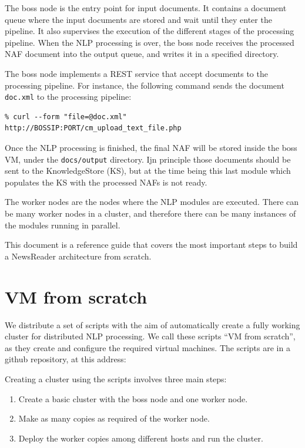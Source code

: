 \documentclass[a4]{article}
\begin{document}
The boss node is the entry point for input documents. It contains a document
queue where the input documents are stored and wait until they enter the
pipeline. It also supervises the execution of the different stages of the
processing pipeline. When the NLP processing is over, the boss node receives
the processed NAF document into the output queue, and writes it in a
specified directory.

The boss node implements a REST service that accept documents to the
processing pipeline. For instance, the following command sends the document
\texttt{doc.xml} to the processing pipeline:

\begin{verbatim}
% curl --form "file=@doc.xml" http://BOSSIP:PORT/cm_upload_text_file.php
\end{verbatim}

Once the NLP processing is finished, the final NAF will be stored inside the
boss VM, under the \texttt{docs/output} directory. Ijn principle those
documents should be sent to the KnowledgeStore (KS), but at the time being
this last module which populates the KS with the processed NAFs is not
ready.

The worker nodes are the nodes where the NLP modules are executed. There can
be many worker nodes in a cluster, and therefore there can be many instances
of the modules running in parallel.

This document is a reference guide that covers the most important steps to
build a NewsReader architecture from scratch.

\section{VM from scratch}
\label{sec:vm-from-scratch}

We distribute a set of scripts with the aim of automatically create a fully
working cluster for distributed NLP processing. We call these scripts ``VM
from scratch'', as they create and configure the required virtual
machines. The scripts are in a github repository, at this address:

Creating a cluster using the scripts involves three main steps:
\begin{enumerate}
\item Create a basic cluster with the boss node and one worker node.
\item Make as many copies as required of the worker node.
\item Deploy the worker copies among different hosts and run the cluster.
\end{enumerate}
\end{document}

